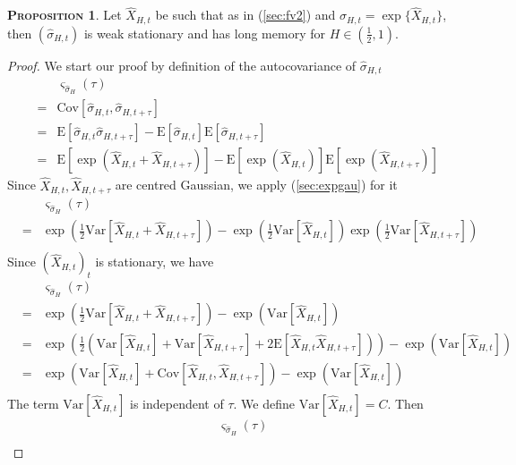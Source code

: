 \documentclass[a4paper, twoside, 11pt]{article}
\theoremstyle{definition}
\newtheorem{proposition}[definition]{\scshape Proposition}
\begin{document}
\begin{proposition}
  Let $\hat{X}_{H,t}$ be such that as in (\ref{sec:fv2}) and $\hat{\sigma}_{H,t} = \exp\{\hat{X}_{H,t}\}$, then $(\hat{\sigma}_{H,t})$ is weak stationary and has long memory for $H\in(\frac{1}{2}, 1)$. 
\end{proposition}
\begin{proof}
  We start our proof by definition of the autocovariance of $\hat{\sigma}_{H,t}$
  \begin{eqnarray*}
	&& \varsigma_{\hat{\sigma}_H}(\tau) \\
	&=& \mathrm{Cov}[\hat{\sigma}_{H,t}, \hat{\sigma}_{H, t+\tau}]\\
	&=& \mathrm{E}[\hat{\sigma}_{H,t} \hat{\sigma}_{H, t+\tau}] - \mathrm{E}[\hat{\sigma}_{H,t}]\mathrm{E}[\hat{\sigma}_{H,t+\tau}]\\
	&=& \mathrm{E}[\exp(\hat{X}_{H,t} + \hat{X}_{H, t+\tau})] - \mathrm{E}[\exp(\hat{X}_{H,t})]\mathrm{E}[\exp(\hat{X}_{H,t+\tau})] 
  \end{eqnarray*}
  Since $\hat{X}_{H,t}, \hat{X}_{H,t+\tau}$ are centred Gaussian, we apply (\ref{sec:expgau}) for it
  \begin{eqnarray*}
	&& \varsigma_{\hat{\sigma}_H}(\tau) \\
	&=& \exp(\frac{1}{2}\mathrm{Var}[\hat{X}_{H,t} + \hat{X}_{H, t+\tau}]) - \exp(\frac{1}{2}\mathrm{Var}[\hat{X}_{H,t}])  \exp(\frac{1}{2}\mathrm{Var}[\hat{X}_{H,t+\tau}])\\
  \end{eqnarray*}
  Since $(\hat{X}_{H,t})_t$ is stationary, we have
  \begin{eqnarray*}
	&& \varsigma_{\hat{\sigma}_H}(\tau) \\
	&=&  \exp(\frac{1}{2}\mathrm{Var}[\hat{X}_{H,t} + \hat{X}_{H, t+\tau}]) - \exp(\mathrm{Var}[\hat{X}_{H,t}])\\
	&=& \exp(\frac{1}{2}(\mathrm{Var}[\hat{X}_{H,t}] + \mathrm{Var}[\hat{X}_{H,t+\tau}] + 2\mathrm{E}[\hat{X}_{H,t}\hat{X}_{H,t+\tau}])) - \exp(\mathrm{Var}[\hat{X}_{H,t}])\\
	&=& \exp(\mathrm{Var}[\hat{X}_{H,t}] + \mathrm{Cov}[\hat{X}_{H,t}, \hat{X}_{H,t+\tau}]) - \exp(\mathrm{Var}[\hat{X}_{H,t}])\\
  \end{eqnarray*}
  The term $\mathrm{Var}[\hat{X}_{H,t}]$ is independent of $\tau$. We define $\mathrm{Var}[\hat{X}_{H,t}] = C$. Then
\begin{eqnarray*}
	&& \varsigma_{\hat{\sigma}_H}(\tau) \\

\end{eqnarray*}
\end{proof}
\end{document}
